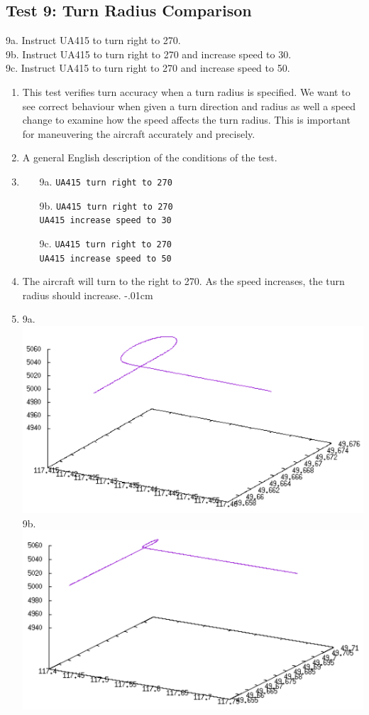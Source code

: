 \documentclass[letterpaper, 12pt]{article}
\begin{document}
\subsection{Test 9: Turn Radius Comparison}
9a. Instruct UA415 to turn right to 270.\\
9b. Instruct UA415 to turn right to 270 and increase speed to 30.\\
9c. Instruct UA415 to turn right to 270 and increase speed to 50.
\begin{enumerate}\itemsep-.15cm
\item This test verifies turn accuracy when a turn radius is specified. We want to see correct behaviour when given a turn direction and radius as well a speed change to examine how the speed affects the turn radius. This is important for maneuvering the aircraft accurately and precisely.
\item A general English description of the conditions of the test.
\item \begin{enumerate}
    \item[9a.] \verb!UA415 turn right to 270!
    \item[9b.] \verb!UA415 turn right to 270!\\
        \verb!UA415 increase speed to 30!
    \item[9c.] \verb!UA415 turn right to 270!\\
        \verb!UA415 increase speed to 50!\\
    \end{enumerate}
\item The aircraft will turn to the right to 270. As the speed increases, the turn radius should increase.
\itemsep-.01cm
\item 9a. \includegraphics[scale=.35,valign=t]{test9_a.png} 9b.\includegraphics[scale=.35,valign=t]{test9_b.png}\\

\end{enumerate}
\end{document}
